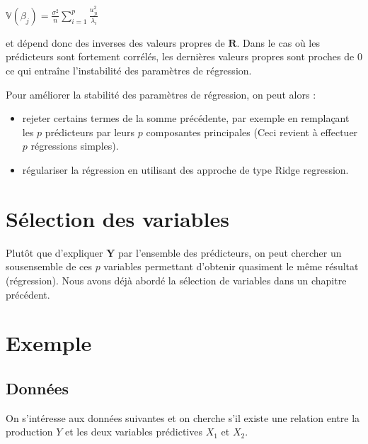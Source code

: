 \documentclass[letterpaper,10pt,english]{jupyterBook}
\begin{document}
\sphinxAtStartPar
\(\mathbb{V}(\beta_j) = \frac{\sigma^2}{n}\displaystyle\sum_{i=1}^p \frac{u_{ji}^2}{\lambda_i}\)

\sphinxAtStartPar
et dépend donc des inverses des valeurs propres de \(\mathbf R\). Dans le cas où les prédicteurs sont fortement corrélés, les dernières valeurs propres sont proches de 0 ce qui entraîne l’instabilité des paramètres de régression.

\sphinxAtStartPar
Pour améliorer la stabilité des paramètres de régression, on peut alors :
\begin{itemize}
\item {} 
\sphinxAtStartPar
rejeter certains termes de la somme précédente, par exemple en remplaçant les \(p\) prédicteurs par leurs \(p\) composantes principales (Ceci revient à effectuer \(p\) régressions simples).

\item {} 
\sphinxAtStartPar
régulariser la régression en utilisant des approche de type Ridge regression.

\end{itemize}


\section{Sélection des variables}
\label{\detokenize{regression:selection-des-variables}}
\sphinxAtStartPar
Plutôt que d’expliquer \(\mathbf Y\) par l’ensemble des prédicteurs, on peut chercher un sous\sphinxhyphen{}ensemble de ces \(p\) variables permettant d’obtenir quasiment le même résultat (régression). Nous avons déjà abordé la sélection de variables dans un chapitre précédent.


\section{Exemple}
\label{\detokenize{regression:exemple}}

\subsection{Données}
\label{\detokenize{regression:donnees}}
\sphinxAtStartPar
On s’intéresse aux données suivantes et on cherche s’il existe une relation entre la production \(Y\) et les deux variables prédictives \(X_1\) et \(X_2\).
\end{document}
